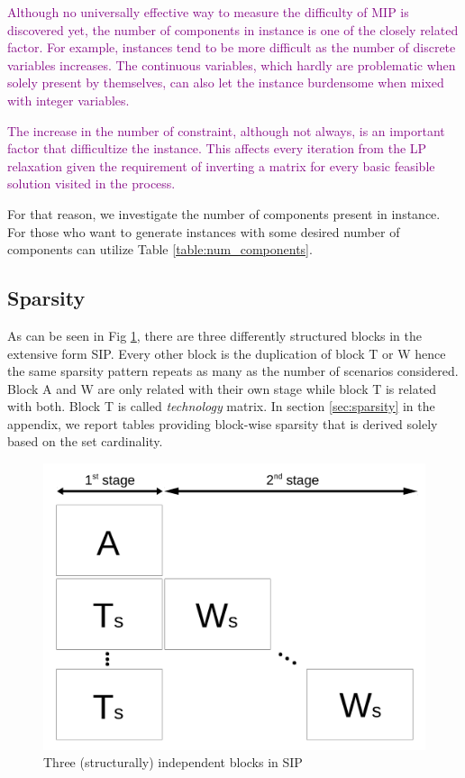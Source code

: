 \textcolor{purple}{Although no universally effective way to measure the difficulty of MIP is discovered yet, the number of components in instance is one of the closely related factor. For example, instances tend to be more difficult as the number of discrete variables increases. The continuous variables, which hardly are problematic when solely present by themselves, can also let the instance burdensome when mixed with integer variables. } 

\textcolor{purple}{The increase in the number of constraint, although not always, is an important factor that difficultize the instance. This affects every iteration from the LP relaxation given the requirement of inverting a matrix for every basic feasible solution visited in the process.}

For that reason, we investigate the number of components present in instance. For those who want to generate instances with some desired number of components can utilize Table \ref{table:num_components}.



\subsection{Sparsity}
As can be seen in Fig \ref{fig:stagewise_sparsity}, there are three differently structured blocks in the extensive form SIP. Every other block is the duplication of block T or W hence the same sparsity pattern repeats as many as the number of scenarios considered. Block A and W are only related with their own stage while block T is related with both. Block T is called \textit{technology}  matrix. In section \ref{sec:sparsity} in the appendix, we report tables providing block-wise sparsity that is derived solely based on the set cardinality.
\begin{figure}
	\centering
	\includegraphics[width=0.7\linewidth]{drawings/stagewise_sparsity}
	\caption{Three (structurally) independent blocks in SIP}
	\label{fig:stagewise_sparsity}
\end{figure}

